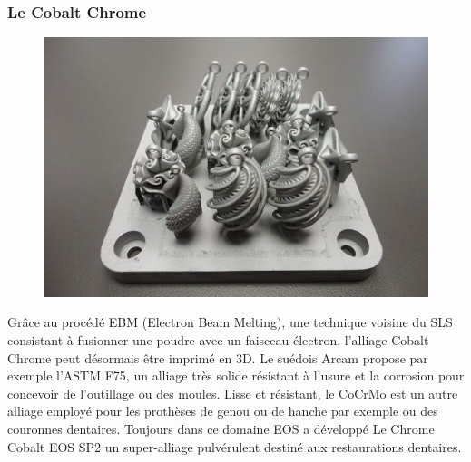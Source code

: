 \documentclass{article}
\begin{document}
\subsubsection{Le Cobalt Chrome}
\begin{figure}[h!]
\centering
\includegraphics[scale=0.3]{./images/cobalt.png}
\end{figure}\hfill
 \par\leavevmode\par
Grâce au procédé EBM (Electron Beam Melting), une technique voisine du SLS consistant à fusionner une poudre avec un faisceau électron, l'alliage Cobalt Chrome peut désormais être imprimé en 3D. Le suédois Arcam propose par exemple l'ASTM F75, un alliage très solide résistant à l'usure et la corrosion pour concevoir de l'outillage ou des moules. Lisse et résistant, le CoCrMo est un autre alliage employé pour les prothèses de genou ou de hanche par exemple ou des couronnes dentaires. Toujours dans ce domaine EOS a développé Le Chrome Cobalt EOS SP2 un super-alliage pulvérulent destiné aux restaurations dentaires.\hfill
 \par\leavevmode\par
{}
\end{document}
